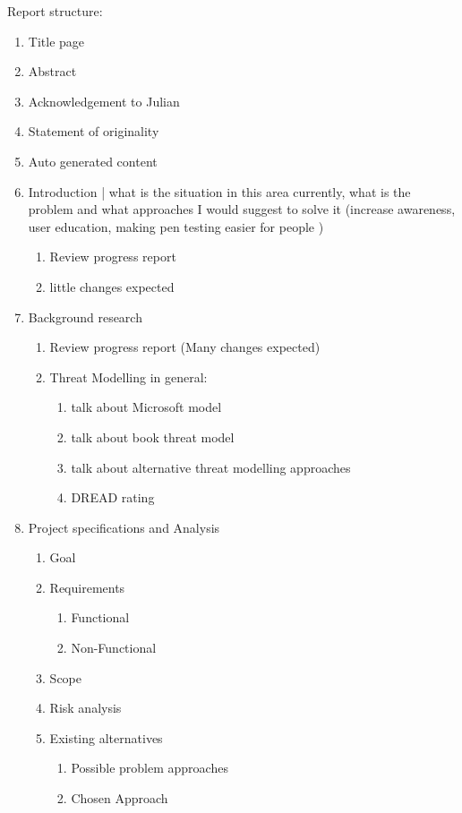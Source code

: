 Report structure:
\begin{enumerate}
	\item Title page
	
	\item Abstract
	
	\item Acknowledgement to Julian
	
	\item Statement of originality
	
	\item Auto generated content
	
	\item Introduction | what is the situation in this area currently, what is the problem and what approaches I would suggest to solve it (increase awareness, user education, making pen testing easier for people )
	\begin{enumerate}
	  	\item Review progress report
	  	\item little changes expected
	\end{enumerate}
	
	\item Background research
	\begin{enumerate}
		\item Review progress report (Many changes expected)
		\item Threat Modelling in general:
		\begin{enumerate}
			\item talk about Microsoft model
			\item talk about book threat model
			\item talk about alternative threat modelling approaches
			\item DREAD rating
		\end{enumerate}
	\end{enumerate}
	
	\item Project specifications and Analysis
	\begin{enumerate}
		\item Goal
		\item Requirements
		\begin{enumerate}
			\item Functional
			\item Non-Functional
		\end{enumerate}
		\item Scope
		\item Risk analysis
		\item Existing alternatives
		\begin{enumerate}
			\item Possible problem approaches
			\item Chosen Approach
		\end{enumerate}
	\end{enumerate}


\end{enumerate}
